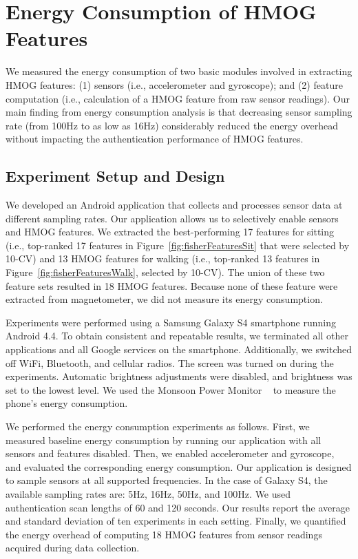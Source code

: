 %

\section{Energy Consumption of HMOG Features}
\label{sec:power}

%
We measured the energy consumption of two basic modules involved in extracting HMOG features:  (1) sensors (i.e., accelerometer and gyroscope); and (2) feature computation (i.e., calculation of a HMOG feature from raw sensor readings). Our main finding from energy consumption analysis is that decreasing sensor sampling rate (from 100Hz to  as low as 16Hz) considerably reduced the energy overhead without impacting the authentication performance of HMOG features. %


\subsection{Experiment Setup and Design}
\label{sec:powerms}

We developed an Android application that collects and processes sensor data at 
different sampling rates. Our application allows us to selectively enable sensors and HMOG features. We extracted the best-performing 17 features for sitting (i.e., top-ranked 17 features in Figure~\ref{fig:fisherFeaturesSit} that were selected by 10-CV) and 13 HMOG features for walking (i.e., top-ranked 13 features in Figure~\ref{fig:fisherFeaturesWalk}, selected by 10-CV). The union of these two feature sets resulted in 18 HMOG features. Because none of these feature were extracted from magnetometer, we did not measure its energy consumption. 
%
%
%
 
%

%
 

 Experiments were performed using a Samsung Galaxy S4 smartphone running Android 4.4. To obtain consistent and repeatable results, we terminated all other applications 
and all Google services on the smartphone. Additionally, we switched off WiFi, 
Bluetooth, and cellular radios. The screen was turned on during the experiments. 
Automatic brightness adjustments were disabled, and brightness was set to the 
lowest level. We used the Monsoon Power Monitor ~\cite{monsoonPowerMonitor} to 
measure the phone's energy consumption.

We performed the energy consumption experiments as follows. First, we measured baseline energy 
consumption by running our application with all sensors and features disabled. 
Then, we enabled accelerometer and gyroscope, and evaluated the corresponding energy consumption.
Our application is designed to sample sensors at all supported frequencies. In the case of Galaxy S4, the available sampling rates are: 5Hz, 16Hz, 50Hz, and 100Hz. 
We used authentication scan lengths of 60 and 120 seconds. Our results report the average and standard deviation of ten experiments in each setting. 
Finally, we quantified the energy overhead of computing 18 HMOG features from sensor readings acquired during data collection.

